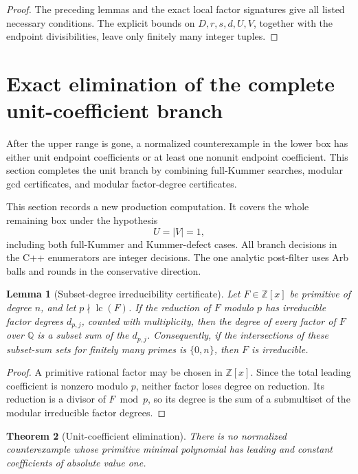 \documentclass[11pt]{article}
\newtheorem{theorem}{Theorem}[section]
\newtheorem{lemma}[theorem]{Lemma}
\theoremstyle{definition}
\newcommand{\Q}{\mathbb Q}
\newcommand{\Z}{\mathbb Z}
\begin{document}
\begin{proof}
The preceding lemmas and the exact local factor signatures give all listed
necessary conditions.  The explicit bounds on \(D,r,s,d,U,V\), together
with the endpoint divisibilities, leave only finitely many integer tuples.
\end{proof}

\section{Exact elimination of the complete unit-coefficient branch}
\label{sec:unitlowercomputation}

After the upper range is gone, a normalized counterexample in the lower box has either unit endpoint coefficients or at least one nonunit endpoint coefficient.  This section completes the unit branch by combining full-Kummer searches, modular gcd certificates, and modular factor-degree certificates.

This section records a new production computation.  It covers the whole
remaining box under the hypothesis
\[
 U=|V|=1,
\]
including both full-Kummer and Kummer-defect cases.  All branch decisions in
the C++ enumerators are integer decisions.  The one analytic post-filter uses
Arb balls and rounds in the conservative direction.

\begin{lemma}[Subset-degree irreducibility certificate]
\label{lem:subsetdegreecertificate}
Let \(F\in\Z[x]\) be primitive of degree \(n\), and let
\(p\nmid\operatorname{lc}(F)\).  If the reduction of \(F\) modulo \(p\)
has irreducible factor degrees \(d_{p,j}\), counted with multiplicity, then
the degree of every factor of \(F\) over \(\Q\) is a subset sum of the
\(d_{p,j}\).  Consequently, if the intersections of these subset-sum sets
for finitely many primes is \(\{0,n\}\), then \(F\) is irreducible.
\end{lemma}

\begin{proof}
A primitive rational factor may be chosen in \(\Z[x]\).  Since the total
leading coefficient is nonzero modulo \(p\), neither factor loses degree on
reduction.  Its reduction is a divisor of \(F\bmod p\), so its degree is the
sum of a submultiset of the modular irreducible factor degrees.
\end{proof}

\begin{theorem}[Unit-coefficient elimination]\label{thm:unitelimination}
There is no normalized counterexample whose primitive minimal polynomial has
leading and constant coefficients of absolute value one.
\end{theorem}
\end{document}
